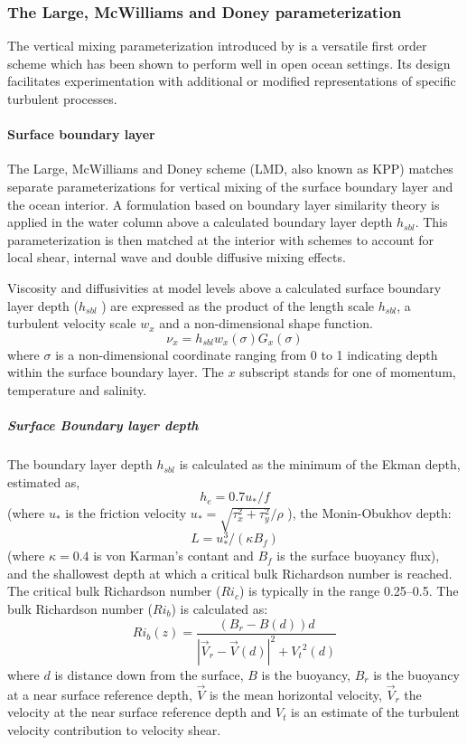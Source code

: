 \subsubsection{The Large, McWilliams and Doney parameterization}
\label{sec:origLMD}

The vertical mixing parameterization introduced by
\citet{Large94} is a versatile first order scheme which has
been shown to perform well in open ocean settings.  Its design
facilitates experimentation with additional or modified representations
of specific turbulent processes.

\paragraph{Surface boundary layer}
The Large, McWilliams and Doney scheme (LMD, also known as KPP)
matches separate parameterizations for vertical mixing
of the surface boundary layer and the ocean interior.  A formulation
based on boundary layer similarity theory is applied in the water
column above a calculated boundary layer depth $h_{sbl}$.  This
parameterization is then matched at the interior with schemes to
account for local shear, internal wave and double diffusive mixing
effects.  

Viscosity and diffusivities at model levels above a calculated
surface boundary layer depth ($h_{sbl}$ ) are expressed as the product
of the length scale $h_{sbl}$, a turbulent velocity scale $w_x$ and a
non-dimensional shape function.
\begin{equation}
\nu_x = h_{sbl} w_x(\sigma)G_x(\sigma)
\end{equation}
where $\sigma$ is a non-dimensional coordinate ranging from 0 to 1
indicating depth within the surface boundary layer. The $x$ subscript
stands for one of momentum, temperature and salinity.

\subparagraph{Surface Boundary layer depth}
The boundary layer depth $h_{sbl}$ is calculated as the minimum of the
Ekman depth, estimated as,
\begin{equation}
h_e=0.7u_*/f
\end{equation}
(where $u_*$ is the friction velocity $u_*=\sqrt{\tau_x^2+\tau_y^2}/\rho$ ),
 the Monin-Obukhov depth:
\begin{equation}
L=u_*^3/(\kappa B_f)
\end{equation}
(where $\kappa = 0.4$ is von Karman's contant and $B_f$ is the surface
buoyancy flux), and the shallowest depth at which a critical bulk
Richardson number is reached. The critical bulk Richardson number
($Ri_c$) is typically in the range 0.25--0.5. The bulk Richardson
number ($Ri_b$) is calculated as:
\begin{equation}
Ri_b(z)=\frac{(B_r-B(d))d}{|\vec{V}_r-\vec{V}(d)|^2+{V_t}^2(d)}
\end{equation}
where $d$ is distance down from the surface, $B$ is the buoyancy,
$B_r$ is the buoyancy at a near surface reference depth, $\vec{V}$ is
the mean horizontal velocity, $\vec{V}_r$ the velocity at the near
surface reference depth and $V_t$ is an estimate of the turbulent
velocity contribution to velocity shear.

